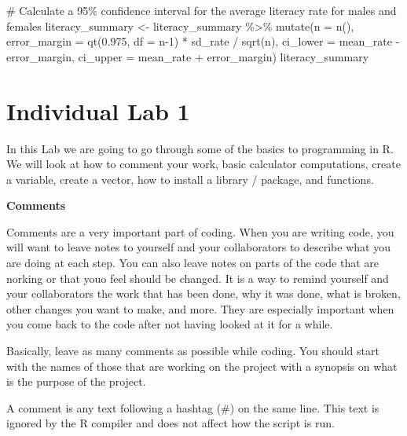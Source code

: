 \documentclass[
  letterpaper,
  DIV=11,
  numbers=noendperiod]{scrreprt}
\newenvironment{Shaded}{\begin{snugshade}}{\end{snugshade}}
\newcommand{\AttributeTok}[1]{\textcolor[rgb]{0.40,0.45,0.13}{#1}}
\newcommand{\CommentTok}[1]{\textcolor[rgb]{0.37,0.37,0.37}{#1}}
\newcommand{\DecValTok}[1]{\textcolor[rgb]{0.68,0.00,0.00}{#1}}
\newcommand{\FloatTok}[1]{\textcolor[rgb]{0.68,0.00,0.00}{#1}}
\newcommand{\FunctionTok}[1]{\textcolor[rgb]{0.28,0.35,0.67}{#1}}
\newcommand{\NormalTok}[1]{\textcolor[rgb]{0.00,0.23,0.31}{#1}}
\newcommand{\OtherTok}[1]{\textcolor[rgb]{0.00,0.23,0.31}{#1}}
\newcommand{\SpecialCharTok}[1]{\textcolor[rgb]{0.37,0.37,0.37}{#1}}
\begin{document}
\begin{Shaded}
\begin{Highlighting}[]
\CommentTok{\# Calculate a 95\% confidence interval for the average literacy rate for males and females}
\NormalTok{literacy\_summary }\OtherTok{\textless{}{-}}\NormalTok{ literacy\_summary }\SpecialCharTok{\%\textgreater{}\%}
  \FunctionTok{mutate}\NormalTok{(}\AttributeTok{n =} \FunctionTok{n}\NormalTok{(),}
         \AttributeTok{error\_margin =} \FunctionTok{qt}\NormalTok{(}\FloatTok{0.975}\NormalTok{, }\AttributeTok{df =}\NormalTok{ n}\DecValTok{{-}1}\NormalTok{) }\SpecialCharTok{*}\NormalTok{ sd\_rate }\SpecialCharTok{/} \FunctionTok{sqrt}\NormalTok{(n),}
         \AttributeTok{ci\_lower =}\NormalTok{ mean\_rate }\SpecialCharTok{{-}}\NormalTok{ error\_margin,}
         \AttributeTok{ci\_upper =}\NormalTok{ mean\_rate }\SpecialCharTok{+}\NormalTok{ error\_margin)}
\NormalTok{literacy\_summary}
\end{Highlighting}
\end{Shaded}

\chapter*{Individual Lab 1}\label{individual-lab-1}


In this Lab we are going to go through some of the basics to programming
in R. We will look at how to comment your work, basic calculator
computations, create a variable, create a vector, how to install a
library / package, and functions.

\textbf{Comments}

Comments are a very important part of coding. When you are writing code,
you will want to leave notes to yourself and your collaborators to
describe what you are doing at each step. You can also leave notes on
parts of the code that are norking or that youo feel should be changed.
It is a way to remind yourself and your collaborators the work that has
been done, why it was done, what is broken, other changes you want to
make, and more. They are especially important when you come back to the
code after not having looked at it for a while.

Basically, leave as many comments as possible while coding. You should
start with the names of those that are working on the project with a
synopsis on what is the purpose of the project.

A comment is any text following a hashtag (\#) on the same line. This
text is ignored by the R compiler and does not affect how the script is
run.
\end{document}
